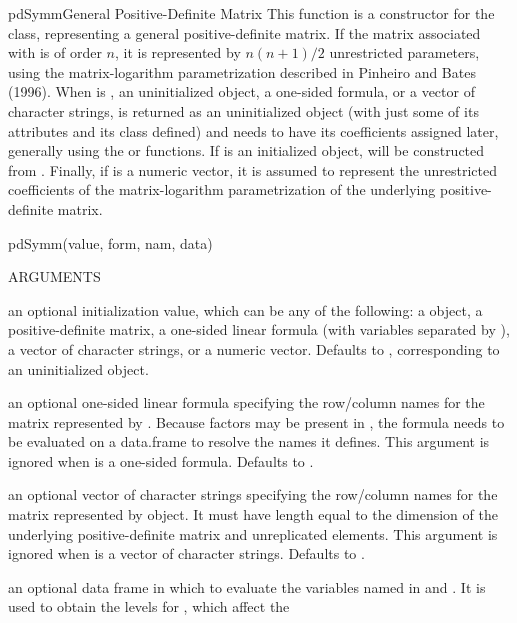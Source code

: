 \documentclass[pdftex]{article} \usepackage{url,graphicx}
\begin{document}
\begin{Helpfile}{pdSymm}{General Positive-Definite Matrix}
  This function is a constructor for the  class,
  representing a general positive-definite matrix. If the matrix
  associated with  is of order $n$, it is represented by
  $n(n+1)/2$ unrestricted parameters, using the matrix-logarithm
  parametrization described in Pinheiro and Bates (1996). When
   is , an uninitialized  object, a
  one-sided formula, or a vector of character strings,  is
  returned as an uninitialized  object (with just some of
  its attributes and its class defined) and needs to have its
  coefficients assigned later, generally using the  or
   functions. If  is an initialized 
  object,  will be constructed from .
  Finally, if  is a numeric vector, it is assumed to
  represent the unrestricted coefficients of the matrix-logarithm
  parametrization of the underlying positive-definite matrix.
\begin{Example}
pdSymm(value, form, nam, data)
\end{Example}
\begin{Argument}{ARGUMENTS}
\item[\Co{value:}]
an optional initialization value, which can be any of the
following: a  object, a positive-definite
matrix, a one-sided linear formula (with variables separated by
\Co{+}), a vector of character strings, or a numeric
vector. Defaults to , corresponding to an
uninitialized object.
\item[\Co{form:}]
an optional one-sided linear formula specifying the
row/column names for the matrix represented by . Because
factors may be present in , the formula needs to be
evaluated on a data.frame to resolve the names it defines. This
argument is ignored when  is a one-sided
formula. Defaults to .
\item[\Co{nam:}]
an optional vector of character strings specifying the
row/column names for the matrix represented by object. It must have 
length equal to the dimension of the underlying positive-definite
matrix and unreplicated elements. This argument is ignored when
 is a vector of character strings. Defaults to
.
\item[\Co{data:}]
an optional data frame in which to evaluate the variables
named in  and . It is used to
obtain the levels for , which affect the

\end{Argument}
\end{Helpfile}
\end{document}
